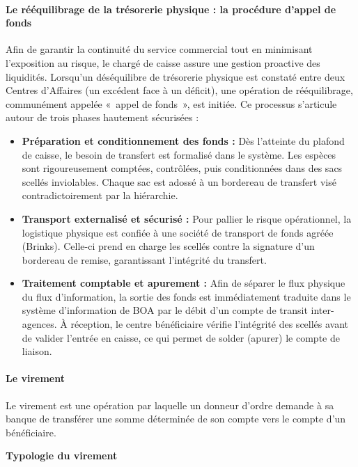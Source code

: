 \paragraph{Le rééquilibrage de la trésorerie physique : la procédure d'appel de fonds}

Afin de garantir la continuité du service commercial tout en minimisant l'exposition au risque, le chargé de caisse assure une gestion proactive des liquidités. Lorsqu'un déséquilibre de trésorerie physique est constaté entre deux Centres d'Affaires (un excédent face à un déficit), une opération de rééquilibrage, communément appelée «~appel de fonds~», est initiée. Ce processus s'articule autour de trois phases hautement sécurisées :

\begin{itemize}
  \item \textbf{Préparation et conditionnement des fonds :} Dès l'atteinte du plafond de caisse, le besoin de transfert est formalisé dans le système. Les espèces sont rigoureusement comptées, contrôlées, puis conditionnées dans des sacs scellés inviolables. Chaque sac est adossé à un bordereau de transfert visé contradictoirement par la hiérarchie.
  \item \textbf{Transport externalisé et sécurisé :} Pour pallier le risque opérationnel, la logistique physique est confiée à une société de transport de fonds agréée (Brinks). Celle-ci prend en charge les scellés contre la signature d'un bordereau de remise, garantissant l'intégrité du transfert.
  \item \textbf{Traitement comptable et apurement :} Afin de séparer le flux physique du flux d'information, la sortie des fonds est immédiatement traduite dans le système d'information de BOA par le débit d'un compte de transit inter-agences. À réception, le centre bénéficiaire vérifie l'intégrité des scellés avant de valider l'entrée en caisse, ce qui permet de solder (apurer) le compte de liaison.
\end{itemize}

\paragraph{Le virement}

Le virement est une opération par laquelle un donneur d'ordre demande à sa banque de transférer une somme déterminée de son compte vers le compte d'un bénéficiaire.

\medskip\textbf{Typologie du virement}

